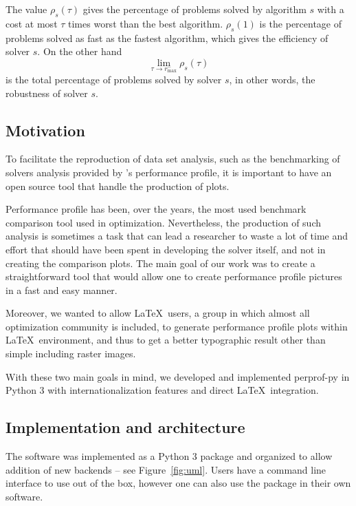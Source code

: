     The value $\rho_s(\tau)$ gives the percentage of problems solved by
    algorithm $s$ with a cost at most $\tau$ times worst than the best
    algorithm. $\rho_s(1)$ is the percentage of problems solved as fast as the
    fastest algorithm, which gives the efficiency of solver $s$.
    On the other hand \[\displaystyle \lim_{\tau\rightarrow r^-_{\max}}
    \rho_s(\tau)\] is the total percentage of problems solved by solver $s$, in
    other words, the robustness of solver $s$.

\subsection*{Motivation}

    To facilitate the reproduction of data set analysis, such as the
    benchmarking of solvers analysis provided by \citeauthor{Dolan:2002du}'s
    performance profile, it is important to have an open source tool that handle
    the production of plots.

    Performance profile has been, over the years, the most used benchmark
    comparison tool used in optimization. Nevertheless, the production of such
    analysis is sometimes a task that can lead a researcher to waste a lot of
    time and effort that should have been spent in developing the solver
    itself, and not in creating the comparison plots. The main goal of our work
    was to create  a straightforward  tool that would allow one to create
    performance profile pictures in a fast and easy manner.

    Moreover,  we wanted to allow \LaTeX\ users, a group in which almost all
    optimization community is included,  to   generate performance profile
    plots within \LaTeX\ environment, and thus to get a better typographic
    result other than simple including raster  images.

    With these two main goals in mind, we developed and implemented perprof-py
    in Python 3 with internationalization features and direct \LaTeX\
    integration.

\subsection*{Implementation and architecture}

    The software was implemented as a Python 3 package
    and organized
    to allow addition of new backends --  see Figure~\ref{fig:uml}.
    Users have a command line interface to use out of the box,
    however one can also use the package in their own software.

